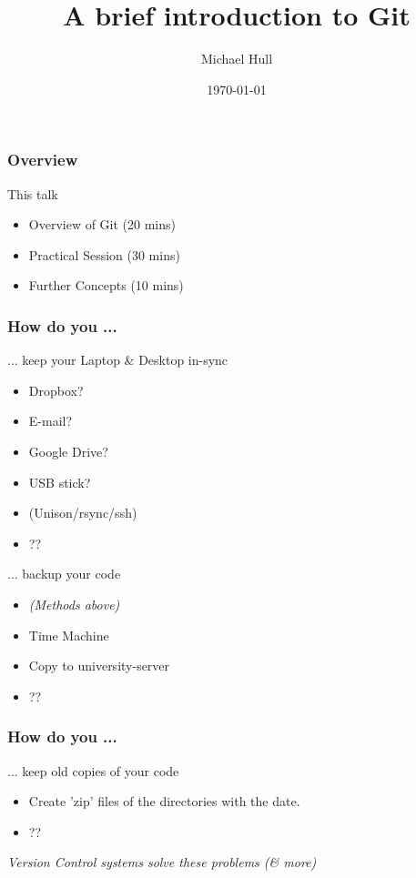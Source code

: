 \documentclass{beamer}
\title[A brief introduction to Git]{A brief introduction to Git}
\author{Michael Hull}
\institute[University of Edinburgh]
{
University of Edinburgh \\
\medskip
{\emph{mikehulluk@googlemail.com}}
}
\date{\today}
\begin{document}
\begin{frame}
\titlepage
\end{frame}


\begin{frame}
\frametitle{Overview}
\begin{block}
{This talk}
\begin{itemize}
\item Overview of Git (20 mins)
\item Practical Session (30 mins)
\item Further Concepts (10 mins)
\end{itemize}
\end{block}
\end{frame}



\begin{frame}
\frametitle{How do you ...}

\begin{block}
{ ... keep your Laptop \& Desktop in-sync}
\begin{itemize}
\item Dropbox?
\item E-mail? 
\item Google Drive?
\item USB stick?
\item (Unison/rsync/ssh)
\item ??
\end{itemize}
\end{block}

\pause

\begin{block}
{... backup your code}
\begin{itemize}
\item \emph{(Methods above)} 
\item Time Machine 
\item Copy to university-server
\item ??
\end{itemize}
\end{block}

\end{frame}



\begin{frame}
\frametitle{How do you ...}
\begin{block}
{... keep old copies of your code}	
\begin{itemize}
\item Create 'zip' files of the directories with the date. 
\item ??
\end{itemize}
\end{block}

\pause

\begin{block}
{ \emph{Version Control systems solve these problems (\& more)}	}
\end{block}




\end{frame}
\end{document}
